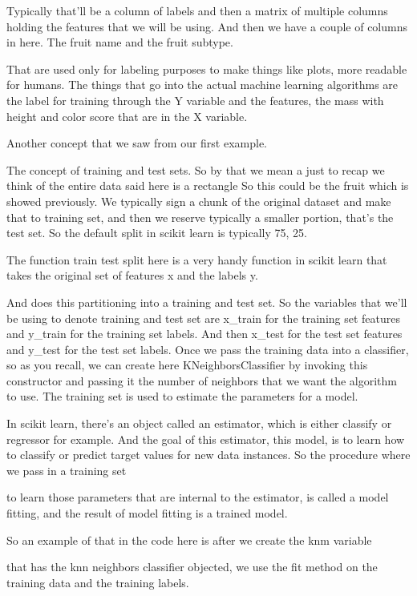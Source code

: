 \begin{multicols}{2}
Typically that'll be a column of labels and then a matrix of multiple columns holding the features that we will be using. And then we have a couple of columns in here. The fruit name and the fruit subtype. 

That are used only for labeling purposes to make things like plots, more readable for humans. The things that go into the actual machine learning algorithms are the label for training through the Y variable and the features, the mass with height and color score that are in the X variable. 

Another concept that we saw from our first example. 

The concept of training and test sets. So by that we mean a just to recap we think of the entire data said here is a rectangle So this could be the fruit which is showed previously. We typically sign a chunk of the original dataset and make that to training set, and then we reserve typically a smaller portion, that's the test set. So the default split in scikit learn is typically 75, 25. 

The function train test split here is a very handy function in scikit learn that takes the original set of features x and the labels y. 

And does this partitioning into a training and test set. So the variables that we'll be using to denote training and test set are x_train for the training set features and y_train for the training set labels. And then x_test for the test set features and y_test for the test set labels. Once we pass the training data into a classifier, so as you recall, we can create here KNeighborsClassifier by invoking this constructor and passing it the number of neighbors that we want the algorithm to use. The training set is used to estimate the parameters for a model. 

In scikit learn, there's an object called an estimator, which is either classify or regressor for example. And the goal of this estimator, this model, is to learn how to classify or predict target values for new data instances. So the procedure where we pass in a training set 

to learn those parameters that are internal to the estimator, is called a model fitting, and the result of model fitting is a trained model. 

So an example of that in the code here is after we create the knm variable 

that has the knn neighbors classifier objected, we use the fit method on the training data and the training labels. 


\end{multicols}
